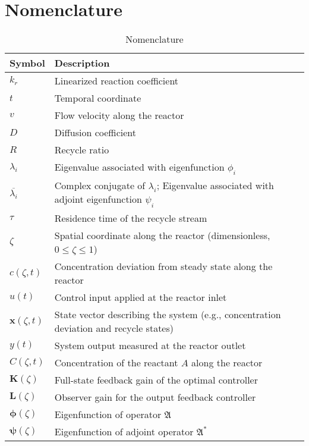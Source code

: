 \section*{Nomenclature}

\begin{table}[ht]
\centering
\caption{Nomenclature}
\begin{tabular}{ll}
\toprule
\textbf{Symbol} & \textbf{Description} \\
\midrule
$k_r$ & Linearized reaction coefficient \\
$t$ & Temporal coordinate \\
$v$ & Flow velocity along the reactor \\
$D$ & Diffusion coefficient \\
$R$ & Recycle ratio \\
$\lambda_i$ & Eigenvalue associated with eigenfunction $\phi_i$ \\
$\overline{\lambda_i}$ & Complex conjugate of $\lambda_i$; Eigenvalue associated with adjoint eigenfunction $\psi_i$ \\
$\tau$ & Residence time of the recycle stream \\
$\zeta$ & Spatial coordinate along the reactor (dimensionless, $0 \leq \zeta \leq 1$) \\

$c(\zeta, t)$ & Concentration deviation from steady state along the reactor \\
$u(t)$ & Control input applied at the reactor inlet \\
$\bm{x}(\zeta, t)$ & State vector describing the system (e.g., concentration deviation and recycle states) \\
$y(t)$ & System output measured at the reactor outlet \\
$C(\zeta, t)$ & Concentration of the reactant $A$ along the reactor \\
$\bm{K}(\zeta)$ & Full-state feedback gain of the optimal controller \\
$\bm{L}(\zeta)$ & Observer gain for the output feedback controller \\
$\bm{\phi}(\zeta)$ & Eigenfunction of operator $\mathfrak{A}$ \\
$\bm{\psi}(\zeta)$ & Eigenfunction of adjoint operator $\mathfrak{A}^*$ \\


\end{tabular}
\end{table}
